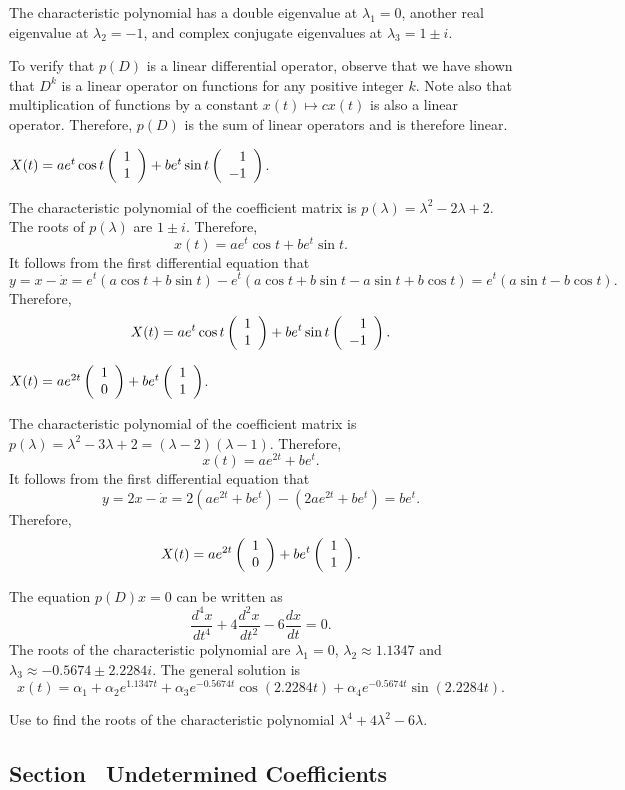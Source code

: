 \documentclass{ximera}
\begin{document}
\soln The characteristic polynomial has a double eigenvalue at
$\lambda_1 = 0$, another real eigenvalue at $\lambda_2 = -1$, and complex
conjugate eigenvalues at $\lambda_3 = 1 \pm i$.

To verify that $p(D)$ is a linear differential operator, observe that we have shown 
that $D^k$ is a linear operator on functions for any positive integer $k$.  Note also
that multiplication of functions by a constant $x(t)\mapsto cx(t)$ is also a linear
operator.  Therefore, $p(D)$ is the sum of linear operators and is therefore linear.

  \ans $X(t) = ae^t\cos t\left(\begin{array}{r} 1 \\ 1\end{array}\right) + be^t\sin t\left(\begin{array}{r} 1 \\ -1\end{array}\right)$.

\soln  The characteristic polynomial of the coefficient matrix is 
$p(\lambda) = \lambda^2-2\lambda+2$.  The roots of $p(\lambda)$ are $1\pm i$. 
Therefore, 
\[
x(t) = ae^t\cos t+be^t\sin t.
\]
It follows from the first differential equation that 
\[
y = x-\dot{x} = e^t(a\cos t+b\sin t) - e^t(a\cos t+b\sin t-a\sin t+b\cos t)
=e^t(a\sin t-b\cos t).
\]
Therefore,
\[
X(t) = ae^t\cos t\left(\begin{array}{r} 1 \\ 1\end{array}\right) + be^t\sin t\left(\begin{array}{r} 1 \\ -1\end{array}\right).
\]

 \ans $X(t) = ae^{2t}\left(\begin{array}{r} 1 \\ 0\end{array}\right) + be^t\left(\begin{array}{r} 1 \\ 1\end{array}\right)$.

\soln  The characteristic polynomial of the coefficient matrix is 
$p(\lambda) = \lambda^2-3\lambda+2=(\lambda-2)(\lambda-1)$.  Therefore, 
\[
x(t) = ae^{2t}+be^t.
\]
It follows from the first differential equation that 
\[
y = 2x-\dot{x} = 2(ae^{2t}+be^t)-(2ae^{2t}+be^t) = be^t.
\]
Therefore,
\[
X(t) = ae^{2t}\left(\begin{array}{r} 1 \\ 0\end{array}\right) + be^t\left(\begin{array}{r} 1 \\ 1\end{array}\right).
\]

 \ans The equation $p(D)x = 0$ can be written as
\[
\frac{d^4x}{dt^4} + 4\frac{d^2x}{dt^2} - 6\frac{dx}{dt} = 0.
\]
The roots of the characteristic polynomial are $\lambda_1 = 0$,
$\lambda_2 \approx 1.1347$ and $\lambda_3 \approx -0.5674 \pm 2.2284i$.
The general solution is
\[
x(t) = \alpha_1 + \alpha_2e^{1.1347t} + \alpha_3e^{-0.5674t}\cos(2.2284t) +
\alpha_4e^{-0.5674t}\sin(2.2284t).
\]

\soln Use \Matlab to find the roots of the characteristic polynomial
$\lambda^4 + 4\lambda^2 - 6\lambda$.



\subsection*{Section~\protect{\ref{sec:2norderinhom}} Undetermined Coefficients}
\end{document}

